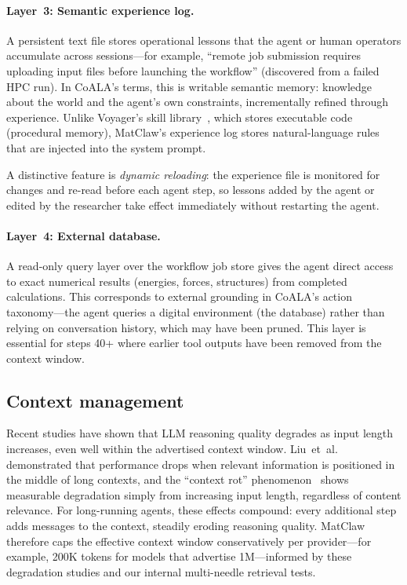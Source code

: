 \documentclass{article}
\begin{document}
\paragraph{Layer~3: Semantic experience log.}
A persistent text file stores operational lessons that the agent or human operators accumulate across sessions---for example, ``remote job submission requires uploading input files before launching the workflow'' (discovered from a failed HPC run).
In CoALA's terms, this is writable semantic memory: knowledge about the world and the agent's own constraints, incrementally refined through experience.
Unlike Voyager's skill library~\citep{Wang2023voyager}, which stores executable code (procedural memory), MatClaw's experience log stores natural-language rules that are injected into the system prompt.

A distinctive feature is \emph{dynamic reloading}: the experience file is monitored for changes and re-read before each agent step, so lessons added by the agent or edited by the researcher take effect immediately without restarting the agent.

\paragraph{Layer~4: External database.}
A read-only query layer over the workflow job store gives the agent direct access to exact numerical results (energies, forces, structures) from completed calculations.
This corresponds to external grounding in CoALA's action taxonomy---the agent queries a digital environment (the database) rather than relying on conversation history, which may have been pruned.
This layer is essential for steps 40+ where earlier tool outputs have been removed from the context window.


\subsection{Context management}
\label{sec:context}

Recent studies have shown that LLM reasoning quality degrades as input length increases, even well within the advertised context window.
Liu~et~al.~\citep{Liu2024lost} demonstrated that performance drops when relevant information is positioned in the middle of long contexts, and the
``context rot'' phenomenon~\citep{ContextRot2025} shows measurable degradation simply from increasing input length, regardless of content relevance.
For long-running agents, these effects compound: every additional step adds messages to the context, steadily eroding reasoning quality.
MatClaw therefore caps the effective context window conservatively per provider---for example, 200K tokens for models that advertise 1M---informed by these degradation studies and our internal multi-needle retrieval tests.
\end{document}
